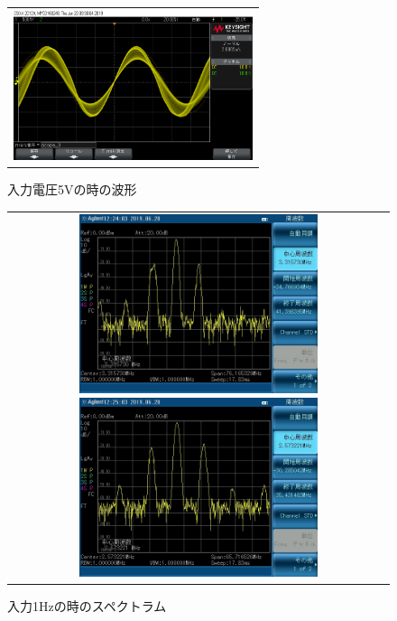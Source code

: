 \begin{figure}[htpb]
\begin{tabular}{c}
    \begin{minipage}{0.50\hsize}
      \centering
      \includegraphics[keepaspectratio, width=7cm]{./data/20V.png}
      \caption{入力電圧5Vの時の波形}
    \end{minipage}
  \end{tabular}
\end{figure}

\begin{figure}[htpb]
  \centering

  \begin{tabular}{c}
    \begin{minipage}{0.50\hsize}
    \centering
    \includegraphics[keepaspectratio, width=7cm]{./data/1Hz.JPG}
    \caption{入力1Hzの時のスペクトラム}
    \end{minipage}

    \begin{minipage}{0.50\hsize}
    \centering
    \includegraphics[keepaspectratio, width=7cm]{./data/1kHz.JPG}
    \caption{入力1Hzの時のスペクトラム}
    \end{minipage}
  \end{tabular}
\end{figure}

